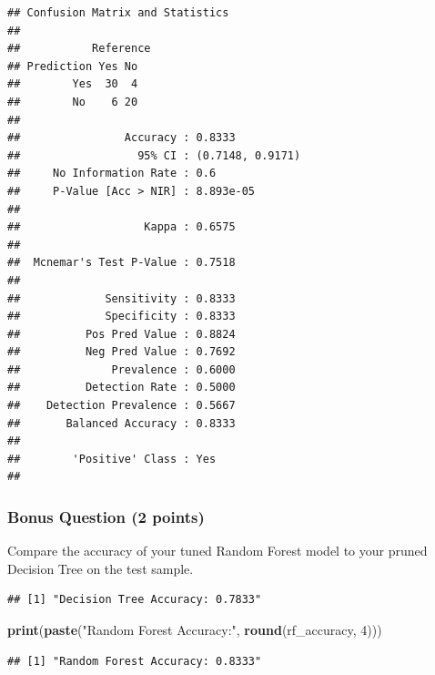 \documentclass[
]{article}
\newenvironment{Shaded}{\begin{snugshade}}{\end{snugshade}}
\newcommand{\CommentTok}[1]{\textcolor[rgb]{0.56,0.35,0.01}{\textit{#1}}}
\newcommand{\DecValTok}[1]{\textcolor[rgb]{0.00,0.00,0.81}{#1}}
\newcommand{\FunctionTok}[1]{\textcolor[rgb]{0.13,0.29,0.53}{\textbf{#1}}}
\newcommand{\NormalTok}[1]{#1}
\newcommand{\OtherTok}[1]{\textcolor[rgb]{0.56,0.35,0.01}{#1}}
\newcommand{\SpecialCharTok}[1]{\textcolor[rgb]{0.81,0.36,0.00}{\textbf{#1}}}
\newcommand{\StringTok}[1]{\textcolor[rgb]{0.31,0.60,0.02}{#1}}
\begin{document}
\begin{verbatim}
## Confusion Matrix and Statistics
## 
##           Reference
## Prediction Yes No
##        Yes  30  4
##        No    6 20
##                                           
##                Accuracy : 0.8333          
##                  95% CI : (0.7148, 0.9171)
##     No Information Rate : 0.6             
##     P-Value [Acc > NIR] : 8.893e-05       
##                                           
##                   Kappa : 0.6575          
##                                           
##  Mcnemar's Test P-Value : 0.7518          
##                                           
##             Sensitivity : 0.8333          
##             Specificity : 0.8333          
##          Pos Pred Value : 0.8824          
##          Neg Pred Value : 0.7692          
##              Prevalence : 0.6000          
##          Detection Rate : 0.5000          
##    Detection Prevalence : 0.5667          
##       Balanced Accuracy : 0.8333          
##                                           
##        'Positive' Class : Yes             
## 
\end{verbatim}

\subsubsection{Bonus Question (2 points)}\label{bonus-question-2-points}

Compare the accuracy of your tuned Random Forest model to your pruned
Decision Tree on the test sample.

\begin{Shaded}
\end{Shaded}

\begin{verbatim}
## [1] "Decision Tree Accuracy: 0.7833"
\end{verbatim}

\begin{Shaded}
\begin{Highlighting}[]
\FunctionTok{print}\NormalTok{(}\FunctionTok{paste}\NormalTok{(}\StringTok{"Random Forest Accuracy:"}\NormalTok{, }\FunctionTok{round}\NormalTok{(rf\_accuracy, }\DecValTok{4}\NormalTok{)))}
\end{Highlighting}
\end{Shaded}

\begin{verbatim}
## [1] "Random Forest Accuracy: 0.8333"
\end{verbatim}
\end{document}
